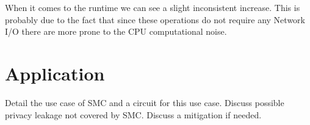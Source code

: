 \documentclass[10pt,conference,compsocconf]{IEEEtran}
\begin{document}
When it comes to the runtime we can see a slight inconsistent increase.
This is probably due to the fact that since these operations do not require any Network I/O there are more
prone to the CPU computational noise.

\section{Application}
Detail the use case of SMC and a circuit for this use case. Discuss possible privacy leakage not
covered by SMC. Discuss a mitigation if needed.



\end{document}
